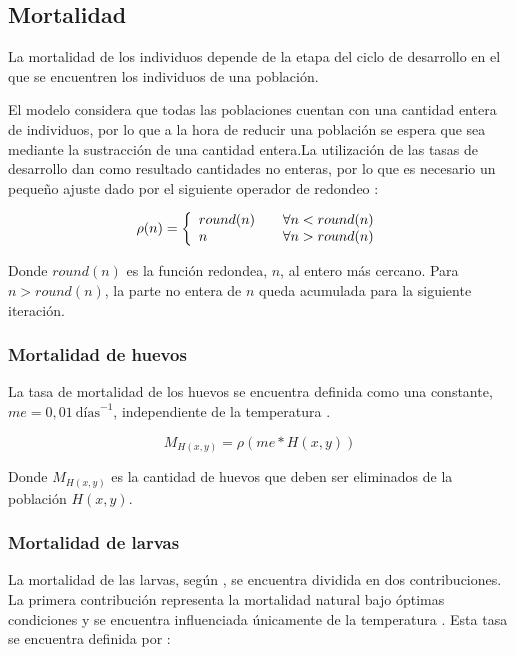 \subsection{Mortalidad}
\label{subsec:cap4-mortalidad}
La mortalidad de los individuos depende de la etapa del ciclo de desarrollo en el que se encuentren
los individuos de una población.

El modelo considera que todas las poblaciones cuentan con una cantidad entera de individuos, por
lo que a la hora de reducir una población se espera que sea mediante la sustracción de una
cantidad entera.La utilización de las tasas de desarrollo dan como resultado cantidades no enteras, por lo que es necesario un pequeño ajuste dado por el siguiente operador de redondeo :

\begin{equation}
\label{eq:operador-redondeo}
\rho(n) = \left\{
\begin{array}{l l}
   round(n) & \quad  \forall n < round(n)\\
   n & \quad  \forall n > round(n)\\
\end{array} \right.
\end{equation}

Donde $round(n)$ es la función redondea, $n$, al entero más cercano. Para $n > round(n)$, la parte
no entera de $n$ queda acumulada para la siguiente iteración.

\subsubsection{Mortalidad de huevos}
La tasa de mortalidad de los huevos se encuentra definida como una constante,
$me = 0,01\ \text{días}^{-1}$, independiente de la temperatura \cite{otero2006stochastic}.

\begin{equation}
    M_{H(x,y)} = \rho(me * H(x,y))
\end{equation}

Donde $M_{H(x,y)}$ es la cantidad de huevos que deben ser eliminados de la población $H(x,y)$.

\subsubsection{Mortalidad de larvas}
La mortalidad de las larvas, según \cite{otero2006stochastic}, se encuentra dividida en dos
contribuciones. La primera contribución representa la mortalidad natural bajo óptimas condiciones
y se encuentra influenciada únicamente de la temperatura \cite{otero2006stochastic}. Esta tasa se
encuentra definida por :


